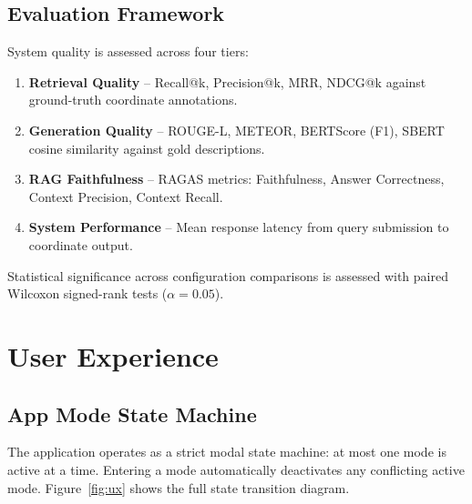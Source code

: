 \documentclass[12pt,a4paper]{article}
\begin{document}
\subsection{Evaluation Framework}

System quality is assessed across four tiers:

\begin{enumerate}[label=\textbf{Tier \arabic*.}, leftmargin=2.5cm, noitemsep]
  \item \textbf{Retrieval Quality} -- Recall@k, Precision@k, MRR, NDCG@k
        against ground-truth coordinate annotations.
  \item \textbf{Generation Quality} -- ROUGE-L, METEOR, BERTScore (F1),
        SBERT cosine similarity against gold descriptions.
  \item \textbf{RAG Faithfulness} -- RAGAS metrics: Faithfulness, Answer
        Correctness, Context Precision, Context Recall.
  \item \textbf{System Performance} -- Mean response latency from query
        submission to coordinate output.
\end{enumerate}

Statistical significance across configuration comparisons is assessed with
paired Wilcoxon signed-rank tests ($\alpha = 0.05$).

\section{User Experience}
\label{sec:ux}

\subsection{App Mode State Machine}

The application operates as a strict modal state machine: at most one mode is
active at a time. Entering a mode automatically deactivates any conflicting
active mode. Figure~\ref{fig:ux} shows the full state transition diagram.
\end{document}
